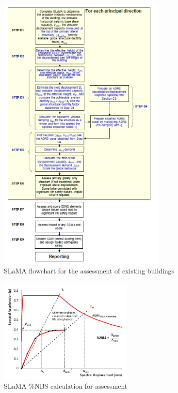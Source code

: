 \begin{figure}[htbp]
	\centering
	\includegraphics[width=0.75\textwidth]{VAC Thesis 2.0/Chapter-6/figs/SLaMA_methodology.jpg}
	\caption{SLaMA flowchart for the assessment of existing buildings}
	\label{fig:slama_CH6}
\end{figure}
\begin{figure}[htbp]
	\centering
	\includegraphics[width=0.60\textwidth]{VAC Thesis 2.0/Chapter-6/figs/nbs_example.jpg}
	\caption{SLaMA \%NBS calculation for assessment}
	\label{fig:nbs_CH6}
\end{figure}
